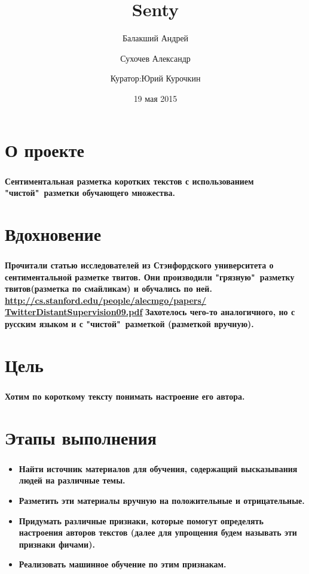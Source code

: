 \documentclass[t]{beamer}
\title{Senty}
\author{Балакший Андрей \and Сухочев Александр 
	\and \newline Куратор:Юрий Курочкин}
\date{19 мая 2015}
\institute[Computer Science Center]
\begin{document}
	\frame[plain]{\titlepage}
	
	
	\section{О проекте}
	\begin{frame}
		\frametitle{\insertsection}
		\textbf{Сентиментальная разметка коротких текстов с использованием "чистой"\ разметки обучающего множества.}
	\end{frame}
	
	
	\section{Вдохновение}
	\begin{frame}
		\frametitle{\insertsection}
		\textbf{Прочитали статью исследователей из Стэнфордского университета о сентиментальной разметке твитов. Они производили "грязную"\ разметку твитов(разметка по смайликам) и обучались по ней. \newline \newline}
        \hyperref[http://cs.stanford.edu/people/alecmgo/papers/TwitterDistantSupervision09.pdf]{\textbf{\underline{http://cs.stanford.edu/people/alecmgo/papers/} \newline \underline{TwitterDistantSupervision09.pdf}}} \pause
		\newline
        \newline
		\textbf{Захотелось чего-то аналогичного, но с русским языком и с "чистой"\ разметкой (разметкой вручную).}
	\end{frame}
	
	
	\section{Цель}
	\begin{frame}
		\frametitle{\insertsection}
		\textbf{Хотим по короткому тексту понимать настроение его автора.}
	\end{frame}
	
	
	\section{Этапы выполнения}
	\begin{frame}
    	
		\frametitle{\insertsection}
		\begin{itemize}
			\item \textbf{Найти источник материалов для обучения, содержащий высказывания людей на различные темы.}	
            \item \textbf{Разметить эти материалы вручную на положительные и отрицательные.}
			\item \textbf{Придумать различные признаки, которые помогут определять настроения авторов текстов (далее для упрощения будем называть эти признаки фичами).}
            \item \textbf{Реализовать машинное обучение по этим признакам.} 
		\end{itemize}
	\end{frame}
	
\end{document}
